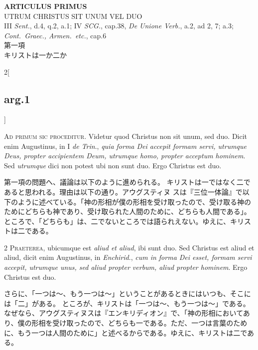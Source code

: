 \documentclass[paper=a4paper,fontsize=10pt,jafontsize=9pt,titlepage]{jlreq}
\begin{document}
\begin{center}
 {\Large {\bfseries ARTICULUS PRIMUS}}\\
 {\large UTRUM CHRISTUS SIT UNUM VEL DUO}\\
 {\footnotesize III {\itshape Sent.}, d.4, q.2, a.1; IV {\itshape SCG.},
 cap.38, {\itshape De Unione Verb.}, a.2, ad 2, 7; a.3; {\itshape
 Cont.~Graec., Armen.~etc.}, cap.6}\\
 {\Large 第一項\\キリストは一か二か}
\end{center}

\begin{paracol}{2}[\subsection{arg.1}]

{\Huge A}{\scshape d primum sic proceditur}. Videtur quod
 Christus non sit unum, sed duo. Dicit enim Augustinus, in I {\itshape de Trin}.,
 {\itshape quia forma Dei accepit formam servi, utrumque Deus, propter accipientem
 Deum, utrumque homo, propter acceptum hominem}. Sed {\itshape utrumque} dici non
 potest ubi non sunt duo. Ergo Christus est duo.

\switchcolumn

第一項の問題へ、議論は以下のように進められる。
キリストは一ではなく二であると思われる。理由は以下の通り。アウグスティヌ
 スは『三位一体論』で以下のように述べている。「神の形相が僕の形相を受け取ったので、受け取る神のためにどちらも神であり、受け取られた人間のために、どちらも人間である」。ところで、「どちらも」は、二でないところでは語られえない。ゆえに、キリストは二である。


{\scshape 2 Praeterea}, ubicumque est {\itshape aliud et aliud},
 ibi sunt duo. Sed Christus est aliud et aliud, dicit enim Augustinus,
 in {\itshape Enchirid}., {\itshape cum in forma Dei esset, formam servi accepit, utrumque
 unus, sed aliud propter verbum, aliud propter hominem}. Ergo Christus
 est duo.

\switchcolumn

さらに、「一つは〜、もう一つは〜」ということがあるときにはいつも、そこには「二」がある。
ところが、キリストは「一つは〜、もう一つは〜」である。なぜなら、アウグスティヌスは『エンキリディオン』で、「神の形相においてあり、僕の形相を受け取ったので、どちらも一である。ただ、一つは言葉のために、もう一つは人間のために」と述べるからである。ゆえに、キリストは二である。


\end{paracol}
\end{document}
